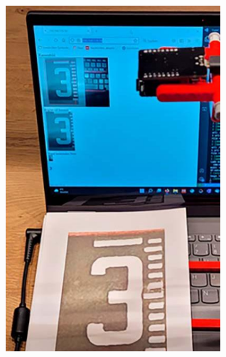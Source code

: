 \documentclass[25pt,a0paper, portrait]{tikzposter}
\begin{document}
\begin{columns}
{{\begin{tikzfigure}
				\includegraphics[width=8cm]{images/ESP32CAM_Field}
			\end{tikzfigure}	
		}
		}
	\end{columns}
	
\end{document}
